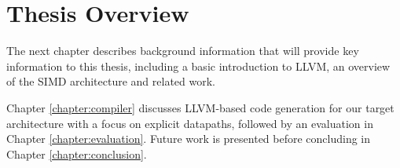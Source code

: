 

\section{Thesis Overview}


The next chapter describes background information that will provide key information to this thesis, including a basic introduction to LLVM, an overview of the SIMD architecture and related work.

Chapter \ref{chapter:compiler} discusses LLVM-based code generation for our target architecture with a focus on explicit datapaths, followed by an evaluation in Chapter \ref{chapter:evaluation}. Future work %
is presented before concluding in Chapter \ref{chapter:conclusion}.

